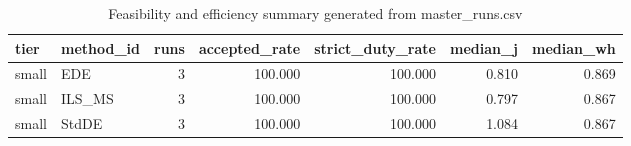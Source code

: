 \begin{table}[!t]
\centering
\caption{Feasibility and efficiency summary generated from master_runs.csv}
\label{tab:feasibility_summary_generated}
\begin{tabular}{llrrrrr}
\toprule
tier & method_id & runs & accepted_rate & strict_duty_rate & median_j & median_wh \\
\midrule
small & EDE & 3 & 100.000 & 100.000 & 0.810 & 0.869 \\
small & ILS_MS & 3 & 100.000 & 100.000 & 0.797 & 0.867 \\
small & StdDE & 3 & 100.000 & 100.000 & 1.084 & 0.867 \\
\bottomrule
\end{tabular}

\end{table}
